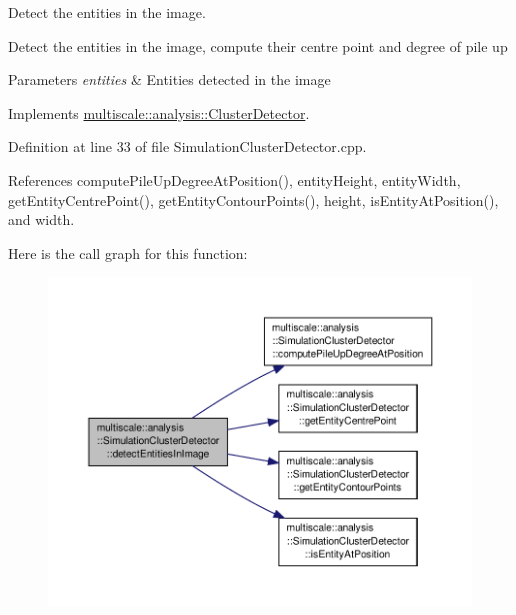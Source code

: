 Detect the entities in the image. 

Detect the entities in the image, compute their centre point and degree of pile up


\begin{DoxyParams}{Parameters}
{\em entities} & Entities detected in the image \\
\hline
\end{DoxyParams}


Implements \hyperlink{classmultiscale_1_1analysis_1_1ClusterDetector_a115f47c1f0855886ef5ca48acc111843}{multiscale\-::analysis\-::\-Cluster\-Detector}.



Definition at line 33 of file Simulation\-Cluster\-Detector.\-cpp.



References compute\-Pile\-Up\-Degree\-At\-Position(), entity\-Height, entity\-Width, get\-Entity\-Centre\-Point(), get\-Entity\-Contour\-Points(), height, is\-Entity\-At\-Position(), and width.



Here is the call graph for this function\-:\nopagebreak
\begin{figure}[H]
\begin{center}
\leavevmode
\includegraphics[width=350pt]{classmultiscale_1_1analysis_1_1SimulationClusterDetector_af3c2206724a69794e12f34fe7fe5082b_cgraph}
\end{center}
\end{figure}



